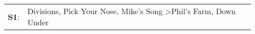 \begin{supertabular}{p{0.03\textwidth}p{0.92\textwidth}}
 \textbf{S1}:  &  Divisions\textsuperscript{}, \enspace Pick Your Nose\textsuperscript{}, \enspace Mike's Song\textsuperscript{} \textgreater \enspace Phil's Farm\textsuperscript{}, \enspace Down Under\textsuperscript{}  \enspace  \\
\end{supertabular}

